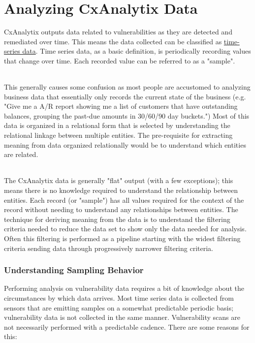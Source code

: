 \chapter{Analyzing CxAnalytix Data}

CxAnalytix outputs data related to vulnerabilities as they are detected and remediated over time.  This means the data collected can be classified as 
\href{https://en.wikipedia.org/wiki/Time_series}{time-series data}.  Time series data, as a basic definition, is periodically recording values that change over time.  
Each recorded value can be referred to as a "sample".

\noindent\\This generally causes some confusion as most people are accustomed to analyzing business data that essentially only records the current state of 
the business (e.g. "Give me a A/R report showing me a list of customers that have outstanding balances, grouping the past-due amounts in 30/60/90 day buckets.")  
Most of this data is organized in a relational form that is selected by understanding the relational linkage between multiple entities.  The pre-requisite for
extracting meaning from data organized relationally would be to understand which entities are related.

\noindent\\The CxAnalytix data is generally "flat" output (with a few exceptions); this means there is no knowledge required to understand the relationship between entities.
Each record (or "sample") has all values required for the context of the record without needing to understand any relationships between entities.  The technique for
deriving meaning from the data is to understand the filtering criteria needed to reduce the data set to show only the data needed for analysis.  Often this filtering is
performed as a pipeline starting with the widest filtering criteria sending data through progressively narrower filtering criteria.

\subsection{Understanding Sampling Behavior}

Performing analysis on vulnerability data requires a bit of knowledge about the circumstances by which data arrives.  Most time series data is collected from 
sensors that are emitting samples on a somewhat predictable periodic basis; vulnerability data is not collected in the same manner. Vulnerability scans are not 
necessarily performed with a predictable cadence.  There are some reasons for this:


